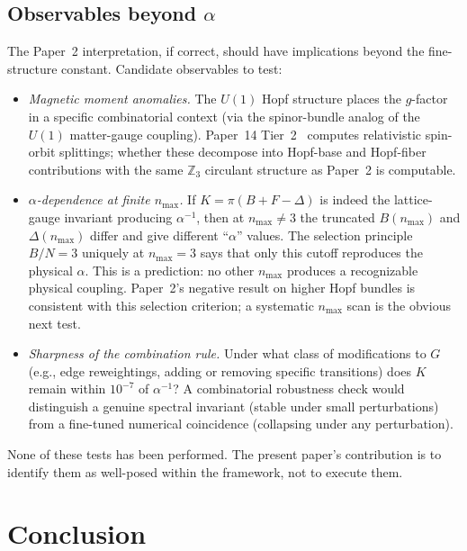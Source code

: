 \documentclass[aps,pra,twocolumn,superscriptaddress,longbibliography]{revtex4-2}
\begin{document}
\subsection{Observables beyond $\alpha$}

The Paper~2 interpretation, if correct, should have implications
beyond the fine-structure constant.  Candidate observables to test:
\begin{itemize}
\item \emph{Magnetic moment anomalies.}  The $U(1)$ Hopf structure
  places the $g$-factor in a specific combinatorial context (via
  the spinor-bundle analog of the $U(1)$ matter-gauge coupling).
  Paper~14 Tier~2~\cite{Paper14} computes relativistic spin-orbit
  splittings; whether these decompose into Hopf-base and
  Hopf-fiber contributions with the same $\mathbb{Z}_3$ circulant
  structure as Paper~2 is computable.
\item \emph{$\alpha$-dependence at finite $n_{\max}$.}  If
  $K = \pi(B + F - \Delta)$ is indeed the lattice-gauge invariant
  producing $\alpha^{-1}$, then at $n_{\max} \neq 3$ the truncated
  $B(n_{\max})$ and $\Delta(n_{\max})$ differ and give different
  ``$\alpha$'' values.  The selection principle $B/N = 3$
  uniquely at $n_{\max} = 3$ says that only this cutoff reproduces
  the physical $\alpha$.  This is a prediction: no other
  $n_{\max}$ produces a recognizable physical coupling.  Paper~2's
  negative result on higher Hopf bundles is consistent with this
  selection criterion; a systematic $n_{\max}$ scan is the obvious
  next test.
\item \emph{Sharpness of the combination rule.}  Under what class of
  modifications to $G$ (e.g., edge reweightings, adding or removing
  specific transitions) does $K$ remain within $10^{-7}$ of
  $\alpha^{-1}$?  A combinatorial robustness check would distinguish
  a genuine spectral invariant (stable under small perturbations)
  from a fine-tuned numerical coincidence (collapsing under any
  perturbation).
\end{itemize}
None of these tests has been performed.  The present paper's
contribution is to identify them as well-posed within the framework,
not to execute them.


\section{Conclusion}
\label{sec:conclusion}
\end{document}
